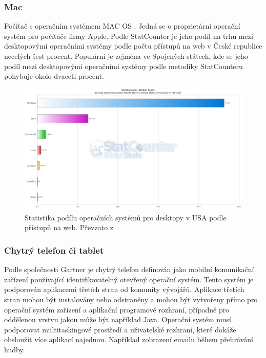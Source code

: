  
 
 \subsubsection{Mac}
 Počítač s operačním systémem MAC OS \cite{AppleMacOS}. Jedná se o proprietární operační systém pro počítače firmy Apple. Podle StatCounter je jeho podíl na trhu mezi desktopovými operačními systémy podle počtu přístupů na web v České republice necelých šest procent. Populární je zejména ve Spojených státech, kde se jeho podíl mezi desktopovými operačními systémy podle metodiky StatCounteru pohybuje okolo dvaceti procent.
 
\begin{figure}[h]
\includegraphics[width=13cm]{img/StatCounter_Destop_USA}
\caption{Statistika podílu operačních systémů pro desktopy v USA podle přístupů na web. Převzato z \cite{Statcounter1}} 
\centering
\end{figure}%
 
 
 \subsubsection{Chytrý telefon či tablet}
 Podle společnosti Gartner \cite{GartnerSmartphone} je chytrý telefon definován jako mobilní komunikační zařízení používající identifikovatelný otevřený operační systém. Tento systém je podporován aplikacemi třetích stran od komunity vývojářů. Aplikace třetích stran mohou být instalovány nebo odstraněny a mohou být vytvořeny přímo pro operační systém zařízení a aplikační programové rozhraní, případně pro oddělenou vrstvu jakou může být například Java. Operační systém musí podporovat multitaskingové prostředí a uživatelské rozhraní, které dokáže obsloužit více aplikací najednou. Například zobrazení emailu během přehrávání hudby.
 
